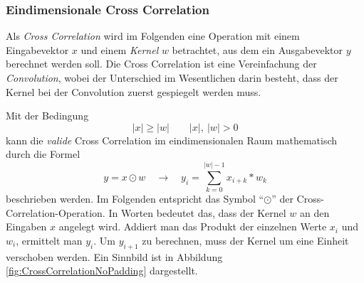 \documentclass[12pt,a4]{article}
\begin{document}
\subsubsection{Eindimensionale Cross Correlation}\label{sec:CrossCorrelation1D}
Als \textit{Cross Correlation} wird im Folgenden eine Operation mit einem Eingabevektor $x$ und einem \textit{Kernel} $w$ betrachtet, aus dem ein Ausgabevektor $y$ berechnet werden soll. Die Cross Correlation ist eine Vereinfachung der \textit{Convolution}, wobei der Unterschied im Wesentlichen darin besteht, dass der Kernel bei der Convolution zuerst gespiegelt werden muss.

Mit der Bedingung
\[
|x| \geq |w| \qquad |x|, \: |w| > 0
\]
kann die \textit{valide} Cross Correlation im eindimensionalen Raum mathematisch durch die Formel
\begin{equation}
y = x \odot w \quad \rightarrow \quad y_i = \sum\limits_{k=0}^{|w| - 1} x_{i+k} * w_{k}
\end{equation}
beschrieben werden. Im Folgenden entspricht das Symbol \enquote{$\odot$} der Cross-Correlation-Operation. In Worten bedeutet das, dass der Kernel $w$ an den Eingaben $x$ angelegt wird. Addiert man das Produkt der einzelnen Werte $x_i$ und $w_i$, ermittelt man $y_i$. Um $y_{i+1}$ zu berechnen, muss der Kernel um eine Einheit verschoben werden. Ein Sinnbild ist in Abbildung \ref{fig:CrossCorrelationNoPadding} dargestellt.
\end{document}
